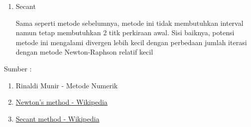 \documentclass[12pt]{article}
\begin{document}
\begin{enumerate}
{\begin{enumerate}
{                Metode ini lebih sulit lagi dari kedua metode diatas, namun perhitungan tidak membutuhkan interval dan membutuhkan jumlah iterasi lebih sedikit. Kelemahan dari metode ini adalah berpotensi tidak menghasilkan apapun jika perhitungan yang dilakukan divergen \bigskip
            }
            \item {
                Secant \bigskip

                Sama seperti metode sebelumnya, metode ini tidak membutuhkan interval namun tetap membutuhkan 2 titk perkiraan awal. Sisi baiknya, potensi metode ini mengalami divergen lebih kecil dengan perbedaan jumlah iterasi dengan metode Newton-Raphson relatif kecil \bigskip
            }
        \end{enumerate}
    }
\end{enumerate}
Sumber : 
\begin{enumerate}
    \item Rinaldi Munir - Metode Numerik
    \item \href{https://en.wikipedia.org/wiki/Newton's_method}{Newton's method - Wikipedia}
    \item \href{https://en.wikipedia.org/wiki/Secant_method}{Secant method - Wikipedia}
\end{enumerate}
\end{document}
